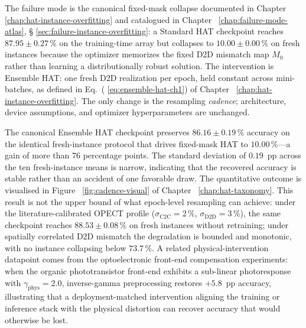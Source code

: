 The failure mode is the canonical fixed-mask collapse documented in Chapter~
\ref{chap:hat-instance-overfitting} and catalogued in Chapter~
\ref{chap:failure-mode-atlas}, \S
\ref{sec:failure-instance-overfitting}: a Standard HAT checkpoint reaches $87.95\pm0.27\,\%$ on the training-time array but collapses to $10.00\pm0.00\,\%$ on fresh instances because the optimizer memorizes the fixed D2D mismatch map $M_{0}$ rather than learning a distributionally robust solution.  The intervention is Ensemble HAT: one fresh D2D realization per epoch, held constant across mini-batches, as defined in Eq.~(
\ref{eq:ensemble-hat-ch1}) of Chapter~
\ref{chap:hat-instance-overfitting}.  The only change is the resampling \emph{cadence}; architecture, device assumptions, and optimizer hyperparameters are unchanged.

The canonical Ensemble HAT checkpoint preserves $86.16\pm0.19\,\%$ accuracy on the identical fresh-instance protocol that drives fixed-mask HAT to $10.00\,\%$---a gain of more than $76$ percentage points.  The standard deviation of $0.19$~pp across the ten fresh-instance means is narrow, indicating that the recovered accuracy is stable rather than an accident of one favorable draw.  The quantitative outcome is visualised in Figure~
\ref{fig:cadence-visual} of Chapter~
\ref{chap:hat-taxonomy}.  This result is not the upper bound of what epoch-level resampling can achieve: under the literature-calibrated OPECT profile ($\sigma_{\mathrm{C2C}}=2\,\%$, $\sigma_{\mathrm{D2D}}=3\,\%$), the same checkpoint reaches $88.53\pm0.08\,\%$ on fresh instances without retraining; under spatially correlated D2D mismatch the degradation is bounded and monotonic, with no instance collapsing below $73.7\,\%$.  A related physical-intervention datapoint comes from the optoelectronic front-end compensation experiments: when the organic phototransistor front-end exhibits a sub-linear photoresponse with $\gamma_{\mathrm{phys}}=2.0$, inverse-gamma preprocessing restores $+5.8$~pp accuracy, illustrating that a deployment-matched intervention aligning the training or inference stack with the physical distortion can recover accuracy that would otherwise be lost.

